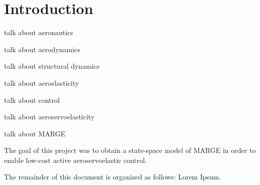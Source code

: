 \chapter{Introduction}
\label{ch:introduction}

talk about aeronautics

talk about aerodynamics

talk about structural dynamics

talk about aeroelasticity

talk about control

talk about aeroservoelasticity

talk about MARGE

The goal of this project was to obtain a state-space model of MARGE in order to enable low-cost active aeroservoelastic control.

The remainder of this document is organized as follows: Lorem Ipsum.